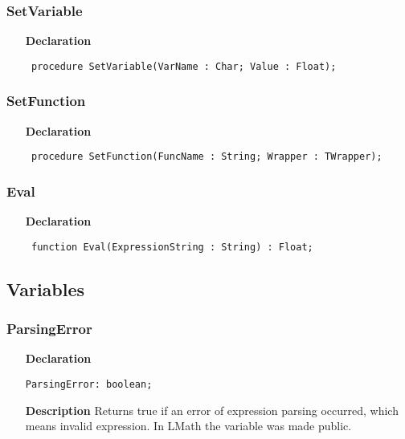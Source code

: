 \documentclass[12pt,a4paper,oneside]{report}
\newcommand{\lmath}[1]{   %
	\marginpar{\vspace{#1} 
		\begin{flushright}
			LMath
	\end{flushright} }
}
\newcommand{\declarationitem}[1]{\textbf{#1}}
\newcommand{\descriptiontitle}[1]{\textbf{#1}}
\newcommand{\code}[1]{\texttt{#1}}
\begin{document}
\subsubsection{SetVariable}
\label{ueval-SetVariable}
\begin{itemize}\item[\declarationitem{Declaration}\hfill]
	\begin{flushleft}
		\code{
			procedure SetVariable(VarName : Char; Value : Float);}
	\end{flushleft}
\end{itemize}
\subsubsection{SetFunction}
\label{ueval-SetFunction}
\begin{itemize}\item[\declarationitem{Declaration}\hfill]
	\begin{flushleft}
		\code{
			procedure SetFunction(FuncName : String; Wrapper : TWrapper);}
	\end{flushleft}
\end{itemize}
\subsubsection{Eval}
\label{ueval-Eval}
\begin{itemize}\item[\declarationitem{Declaration}\hfill]
	\begin{flushleft}
		\code{
			function Eval(ExpressionString : String) : Float;}
	\end{flushleft}
\end{itemize}
\subsection{Variables}
\subsubsection{ParsingError}\lmath{-24pt}
\label{ueval-parsingerror}
\begin{itemize}
\item[\declarationitem{Declaration}\hfill]
\begin{flushleft}
	\code{ParsingError: boolean;}
\end{flushleft}
\item[\descriptiontitle{Description}] Returns true if an error of expression parsing occurred, which means invalid expression. In LMath the variable was made public.
\end{itemize}
\end{document}

